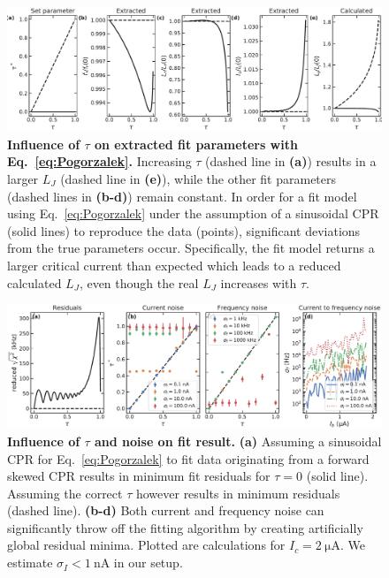 \begin{figure}
	\centering
	\includegraphics[width=\linewidth]{chapter-gJJ-CPR/figs/SMFigure-tauparams}
	\caption{
		\textbf{Influence of $\tau$ on extracted fit parameters with Eq.~\ref{eq:Pogorzalek}.}
		Increasing $\tau$ (dashed line in \textbf{(a)}) results in a larger $L_J$ (dashed line in \textbf{(e)}), while the other fit parameters (dashed lines in \textbf{(b-d)}) remain constant.
		In order for a fit model using Eq.~\ref{eq:Pogorzalek} under the assumption of a sinusoidal CPR (solid lines) to reproduce the data (points), significant deviations from the true parameters occur.
		Specifically, the fit model returns a larger critical current than expected which leads to a reduced calculated $L_J$, even though the real $L_J$ increases with $\tau$.
	}
	\label{fig:SMtau}
\end{figure}

\begin{figure}
	\centering
	\includegraphics[width=\linewidth]{chapter-gJJ-CPR/figs/SMFigure-noise}
	\caption{
		\textbf{Influence of $\tau$ and noise on fit result.}
		\textbf{(a)} Assuming a sinusoidal CPR for Eq.~\ref{eq:Pogorzalek} to fit data originating from a forward skewed CPR results in minimum fit residuals for $\tau=0$ (solid line).
		Assuming the correct $\tau$ however results in minimum residuals (dashed line).
		\textbf{(b-d)} Both current and frequency noise can significantly throw off the fitting algorithm by creating artificially global residual minima.
		Plotted are calculations for $I_c=\SI{2}{\micro\ampere}$.
		We estimate $\sigma_I<\SI{1}{\nano\ampere}$ in our setup.
	}
	\label{fig:SMres}
\end{figure}


